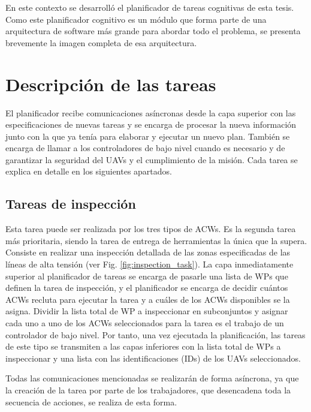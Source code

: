 \documentclass[fontsize=11pt, English=false, Español=true, Myfinal=true, twoside, numbers=noenddot]{scrbook}
\begin{document}
En este contexto se desarrolló el planificador de tareas cognitivas de esta tesis. Como este planificador cognitivo es un módulo que forma parte de una arquitectura de software más grande para abordar todo el problema, se presenta brevemente la imagen completa de esa arquitectura. 


\section{Descripción de las tareas}
\label{sec:DescriptionOfTasks}
El planificador recibe comunicaciones asíncronas desde la capa superior con las especificaciones de nuevas tareas y se encarga de procesar la nueva información junto con la que ya tenía para elaborar y ejecutar un nuevo plan. También se encarga de llamar a los controladores de bajo nivel cuando es necesario y de garantizar la seguridad del \glspl{UAV} y el cumplimiento de la misión. Cada tarea se explica en detalle en los siguientes apartados.

\subsection{Tareas de inspección}
\label{subsec:InspectionTasks}
Esta tarea puede ser realizada por los tres tipos de \glspl{ACW}. Es la segunda tarea más prioritaria, siendo la tarea de entrega de herramientas la única que la supera. Consiste en realizar una inspección detallada de las zonas especificadas de las líneas de alta tensión (ver Fig. \ref{fig:inspection_task}). La capa inmediatamente superior al planificador de tareas se encarga de pasarle una lista de \glspl{WP} que definen la tarea de inspección, y el planificador se encarga de decidir cuántos \glspl{ACW} recluta para ejecutar la tarea y a cuáles de los \glspl{ACW} disponibles se la asigna. Dividir la lista total de \gls{WP} a inspeccionar en subconjuntos y asignar cada uno a uno de los \glspl{ACW} seleccionados para la tarea es el trabajo de un controlador de bajo nivel. Por tanto, una vez ejecutada la planificación, las tareas de este tipo se transmiten a las capas inferiores con la lista total de \glspl{WP} a inspeccionar y una lista con las identificaciones (\glspl{ID}) de los \glspl{UAV} seleccionados.

Todas las comunicaciones mencionadas se realizarán de forma asíncrona, ya que la creación de la tarea por parte de los trabajadores, que desencadena toda la secuencia de acciones, se realiza de esta forma.
\end{document}
